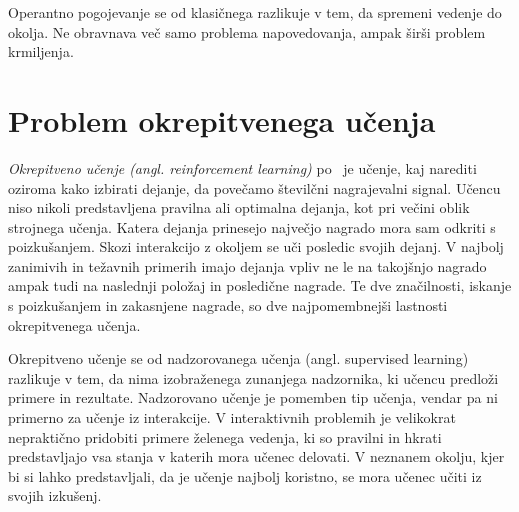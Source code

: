 \documentclass[a4paper, oneside, 12pt]{report}
\begin{document}
Operantno pogojevanje se od klasičnega razlikuje v tem, da spremeni vedenje do okolja. Ne obravnava več samo problema napovedovanja, ampak širši problem krmiljenja.

\chapter{Problem okrepitvenega učenja} \label{chapter:Problem}
\thispagestyle{fancy}
{\em Okrepitveno učenje (angl. reinforcement learning)} po~\cite{ReinforcementLearningAnIntroduction} je učenje, kaj narediti oziroma kako izbirati dejanje, da povečamo številčni nagrajevalni signal. Učencu niso nikoli predstavljena pravilna ali optimalna dejanja, kot pri večini oblik strojnega učenja. Katera dejanja prinesejo največjo nagrado mora sam odkriti s poizkušanjem. Skozi interakcijo z okoljem se uči posledic svojih dejanj. V najbolj zanimivih in težavnih primerih imajo dejanja vpliv ne le na takojšnjo nagrado ampak tudi na naslednji položaj in posledične nagrade. Te dve značilnosti, iskanje s poizkušanjem in zakasnjene nagrade, so dve najpomembnejši lastnosti okrepitvenega učenja.


Okrepitveno učenje se od nadzorovanega učenja (angl. supervised learning) razlikuje v tem, da nima izobraženega zunanjega nadzornika, ki učencu predloži primere in rezultate. Nadzorovano učenje je pomemben tip učenja, vendar pa ni primerno za učenje iz interakcije. V interaktivnih problemih je velikokrat nepraktično pridobiti primere želenega vedenja, ki so pravilni in hkrati predstavljajo vsa stanja v katerih mora učenec delovati. V neznanem okolju, kjer bi si lahko predstavljali, da je učenje najbolj koristno, se mora učenec učiti iz svojih izkušenj.
\end{document}
